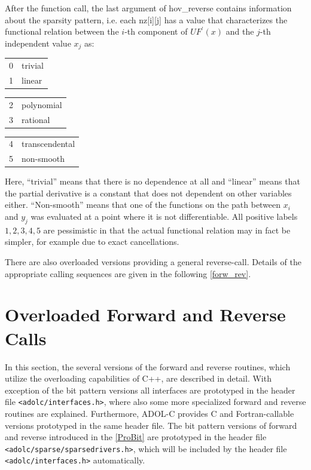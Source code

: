 \documentclass[11pt,twoside]{article}
\begin{document}
After the function call, the last argument of {\sf hov\_reverse} 
contains information about the sparsity pattern, i.e. each {\sf nz[i][j]}
has a value that characterizes the functional relation between the
$i$-th component of $UF^\prime(x)$ and the $j$-th independent value
$x_j$ as:
\begin{center}
\begin{tabular}{ll}
 0 & trivial \\
 1 & linear 
\end{tabular} \hspace*{4ex}
\begin{tabular}{ll}
 2 & polynomial\\
 3 & rational
\end{tabular} \hspace*{4ex}
\begin{tabular}{ll}
 4 & transcendental\\
 5 & non-smooth
\end{tabular}
\end{center}
Here, ``trivial'' means that there is no dependence at all and ``linear'' means
that the partial derivative is a constant that
does not dependent on other variables either. ``Non-smooth'' means that one of
the functions on the path between $x_i$ and $y_j$ was evaluated at a point 
where it is not differentiable.  All positive labels
$1, 2, 3, 4, 5$ are pessimistic in that the actual functional relation may
in fact be simpler, for example due to exact cancellations.  

There are also overloaded versions providing a general {\sf reverse}-call.
Details of the appropriate calling sequences are given in the following \autoref{forw_rev}.



%
\section{Overloaded Forward and Reverse Calls}
\label{forw_rev}
%
In this section, the several versions of the {\sf forward} and 
{\sf reverse} routines, which utilize the overloading capabilities
of C++, are described in detail. With exception of the bit pattern
versions all interfaces are prototyped in the header file 
\verb=<adolc/interfaces.h>=, where also some more specialized {\sf forward}
and {\sf reverse} routines are explained. Furthermore, \mbox{ADOL-C} provides
C and Fortran-callable versions prototyped in the same header file.
The bit pattern versions of {\sf forward} and {\sf reverse} introduced
in the \autoref{ProBit} are prototyped in the header file
\verb=<adolc/sparse/sparsedrivers.h>=, which will be included by the header 
file \verb=<adolc/interfaces.h>= automatically.
%
\end{document}
